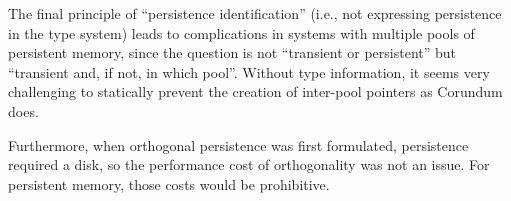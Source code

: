 The final principle of “persistence identification” (i.e., not
expressing persistence in the type system) leads to complications in systems
with multiple pools of persistent memory, since the question is not “transient
or persistent” but “transient and, if not, in which pool”.  Without type
information, it seems very challenging to statically prevent the creation of
inter-pool pointers as Corundum does.

Furthermore, when orthogonal persistence was first formulated, persistence
required a disk, so the performance cost of orthogonality was not an issue.
For persistent memory, those costs would be prohibitive.







